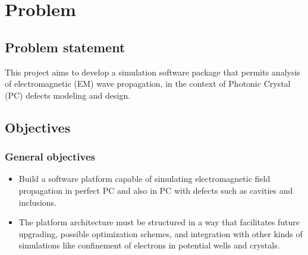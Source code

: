 \chapter{Problem}
\label{ch:Problem}

\section{Problem statement}

This project aims to develop a simulation software package that permits analysis of electromagnetic (EM) wave propagation, in the context of Photonic Crystal (PC) defects modeling and design.

\section{Objectives }

\subsection{General objectives}
\begin{itemize}
\item Build a software platform capable of simulating   electromagnetic field propagation in perfect PC and also in PC with defects such as cavities and inclusions.
\item The platform architecture must be structured in a way that facilitates future upgrading, possible optimization schemes, and integration with other kinds of simulations like confinement of electrons in potential wells and crystals. 
\end{itemize}



